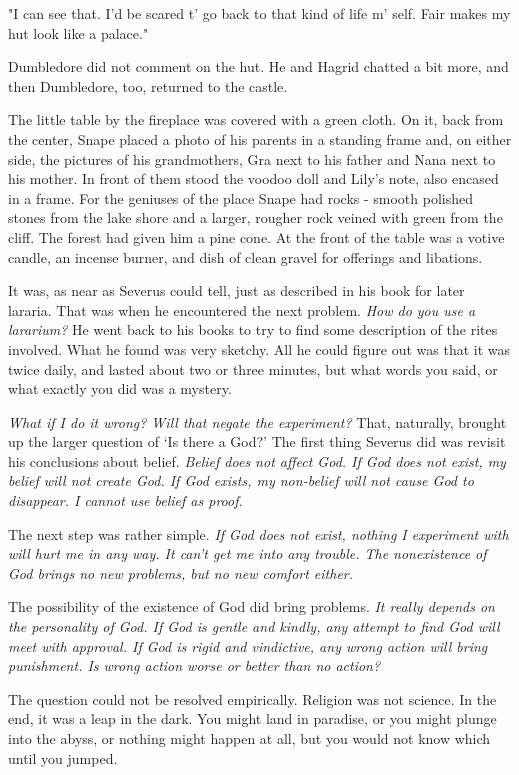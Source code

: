 "I can see that. I'd be scared t' go back to that kind of life m' self. Fair makes my hut look like a palace."

Dumbledore did not comment on the hut. He and Hagrid chatted a bit more, and then Dumbledore, too, returned to the castle.

The little table by the fireplace was covered with a green cloth. On it, back from the center, Snape placed a photo of his parents in a standing frame and, on either side, the pictures of his grandmothers, Gra next to his father and Nana next to his mother. In front of them stood the voodoo doll and Lily's note, also encased in a frame. For the geniuses of the place Snape had rocks - smooth polished stones from the lake shore and a larger, rougher rock veined with green from the cliff. The forest had given him a pine cone. At the front of the table was a votive candle, an incense burner, and dish of clean gravel for offerings and libations.

It was, as near as Severus could tell, just as described in his book for later lararia. That was when he encountered the next problem. \emph{How do you use a lararium?} He went back to his books to try to find some description of the rites involved. What he found was very sketchy. All he could figure out was that it was twice daily, and lasted about two or three minutes, but what words you said, or what exactly you did was a mystery.

\emph{What if I do it wrong? Will that negate the experiment?} That, naturally, brought up the larger question of `Is there a God?' The first thing Severus did was revisit his conclusions about belief. \emph{Belief does not affect God. If God does not exist, my belief will not create God. If God exists, my non-belief will not cause God to disappear. I cannot use belief as proof.}

The next step was rather simple. \emph{If God does not exist, nothing I experiment with will hurt me in any way. It can't get me into any trouble. The nonexistence of God brings no new problems, but no new comfort either.}

The possibility of the existence of God did bring problems. \emph{It really depends on the personality of God. If God is gentle and kindly, any attempt to find God will meet with approval. If God is rigid and vindictive, any wrong action will bring punishment. Is wrong action worse or better than no action?}

The question could not be resolved empirically. Religion was not science. In the end, it was a leap in the dark. You might land in paradise, or you might plunge into the abyss, or nothing might happen at all, but you would not know which until you jumped.

